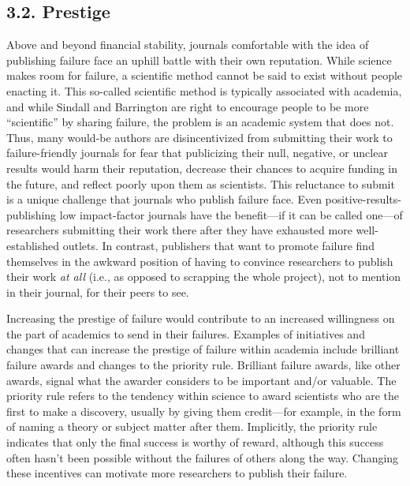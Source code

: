 \documentclass[empirical, author-date]{jote-article}
\begin{document}
\subsection{3.2. Prestige }

Above and beyond financial stability, journals comfortable with the idea of publishing failure face an uphill battle with their own reputation. While science makes room for failure, a scientific method cannot be said to exist without people enacting it. This so-called scientific method is typically associated with academia, and while Sindall and Barrington are right to encourage people to be more “scientific” by sharing failure, the problem is an academic system that does not. Thus, many would-be authors are disincentivized from submitting their work to failure-friendly journals for fear that publicizing their null, negative, or unclear results would harm their reputation, decrease their chances to acquire funding in the future, and reflect poorly upon them as scientists. This reluctance to submit is a unique challenge that journals who publish failure face. Even positive-results-publishing low impact-factor journals have the benefit—if it can be called one—of researchers submitting their work there after they have exhausted more well-established outlets. In contrast, publishers that want to promote failure find themselves in the awkward position of having to convince researchers to publish their work \emph{at all} (i.e., as opposed to scrapping the whole project), not to mention in their journal, for their peers to see. 

Increasing the prestige of failure would contribute to an increased willingness on the part of academics to send in their failures. Examples of initiatives and changes that can increase the prestige of failure within academia include brilliant failure awards and changes to the priority rule. Brilliant failure awards, like other awards, signal what the awarder considers to be important and/or valuable. The priority rule refers to the tendency within science to award scientists who are the first to make a discovery, usually by giving them credit—for example, in the form of naming a theory or subject matter after them. Implicitly, the priority rule indicates that only the final success is worthy of reward, although this success often hasn't been possible without the failures of others along the way. Changing these incentives can motivate more researchers to publish their failure. 
\end{document}
